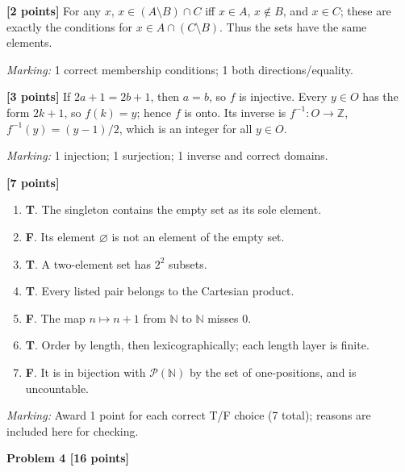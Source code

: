 \documentclass[12pt,letterpaper]{article}
\newcommand{\problemheading}[2][5\baselineskip]{\Needspace{#1}\par\noindent\hspace*{-0.625in}\textbf{#2}\par\nobreak\vspace{0.3em}}
\begin{document}
\begin{description}[font=\normalfont,leftmargin=1.2em,labelsep=0.4em]
\item[(a)] \textbf{[2 points]} For any $x$, $x\in(A\setminus B)\cap C$ iff $x\in A$, $x\notin B$, and $x\in C$; these are exactly the conditions for $x\in A\cap(C\setminus B)$. Thus the sets have the same elements.
\par\textit{Marking:} 1 correct membership conditions; 1 both directions/equality.
\item[(b)] \textbf{[3 points]} If $2a+1=2b+1$, then $a=b$, so $f$ is injective. Every $y\in O$ has the form $2k+1$, so $f(k)=y$; hence $f$ is onto. Its inverse is $f^{-1}:O\to\mathbb Z$, $f^{-1}(y)=(y-1)/2$, which is an integer for all $y\in O$.
\par\textit{Marking:} 1 injection; 1 surjection; 1 inverse and correct domains.
\item[(c)] \textbf{[7 points]} \begin{enumerate}[label=(\roman*)]\item \textbf{T}. The singleton contains the empty set as its sole element.\item \textbf{F}. Its element $\varnothing$ is not an element of the empty set.\item \textbf{T}. A two-element set has $2^2$ subsets.\item \textbf{T}. Every listed pair belongs to the Cartesian product.\item \textbf{F}. The map $n\mapsto n+1$ from $\mathbb N$ to $\mathbb N$ misses 0.\item \textbf{T}. Order by length, then lexicographically; each length layer is finite.\item \textbf{F}. It is in bijection with $\mathcal P(\mathbb N)$ by the set of one-positions, and is uncountable.\end{enumerate}
\par\textit{Marking:} Award 1 point for each correct T/F choice (7 total); reasons are included here for checking.
\end{description}
\vspace{0.65em}
\problemheading[\dimexpr 3\baselineskip+4\baselineskip\relax]{Problem 4 [16 points]}
\end{document}
